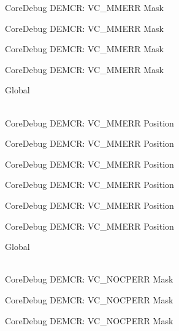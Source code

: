 \begin{DoxyRefList}
\label{deprecated__deprecated000354}%
%
Core\+Debug DEMCR\+: VC\+\_\+\+MMERR Mask 

\label{deprecated__deprecated000430}%
%
Core\+Debug DEMCR\+: VC\+\_\+\+MMERR Mask 

\label{deprecated__deprecated000519}%
%
Core\+Debug DEMCR\+: VC\+\_\+\+MMERR Mask 

\label{deprecated__deprecated000621}%
%
Core\+Debug DEMCR\+: VC\+\_\+\+MMERR Mask  
\item[{\parbox[t]{\linewidth}{Global \doxylink{group___c_m_s_i_s___core_debug_ga444454f7c7748e76cd76c3809c887c41}{Core\+Debug\+\_\+\+DEMCR\+\_\+\+VC\+\_\+\+MMERR\+\_\+\+Pos} }}]\hfill \\
\label{deprecated__deprecated000067}%
%
Core\+Debug DEMCR\+: VC\+\_\+\+MMERR Position 

\label{deprecated__deprecated000211}%
%
Core\+Debug DEMCR\+: VC\+\_\+\+MMERR Position 

\label{deprecated__deprecated000353}%
%
Core\+Debug DEMCR\+: VC\+\_\+\+MMERR Position 

\label{deprecated__deprecated000429}%
%
Core\+Debug DEMCR\+: VC\+\_\+\+MMERR Position 

\label{deprecated__deprecated000518}%
%
Core\+Debug DEMCR\+: VC\+\_\+\+MMERR Position 

\label{deprecated__deprecated000620}%
%
Core\+Debug DEMCR\+: VC\+\_\+\+MMERR Position  
\item[{\parbox[t]{\linewidth}{Global \doxylink{group___c_m_s_i_s___core_debug_ga03ee58b1b02fdbf21612809034562f1c}{Core\+Debug\+\_\+\+DEMCR\+\_\+\+VC\+\_\+\+NOCPERR\+\_\+\+Msk} }}]\hfill \\
\label{deprecated__deprecated000066}%
%
Core\+Debug DEMCR\+: VC\+\_\+\+NOCPERR Mask 

\label{deprecated__deprecated000210}%
%
Core\+Debug DEMCR\+: VC\+\_\+\+NOCPERR Mask 

\label{deprecated__deprecated000352}%
%
Core\+Debug DEMCR\+: VC\+\_\+\+NOCPERR Mask 


\end{DoxyRefList}
